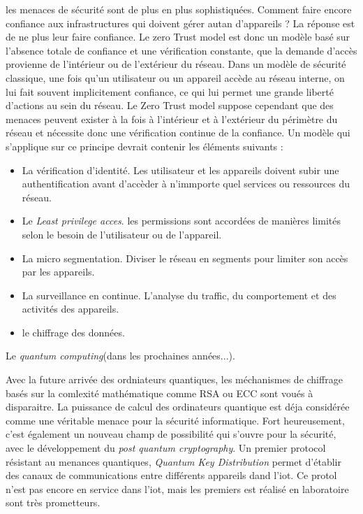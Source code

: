 les menaces de sécurité sont de plus en plus sophistiquées. Comment faire encore confiance aux infrastructures qui doivent gérer autan d'appareils ? La réponse est de ne plus leur faire confiance. Le zero Trust model est donc un modèle basé sur l'absence totale de confiance et une vérification constante, que la demande d'accès provienne de l'intérieur ou de l'extérieur du réseau. Dans un modèle de sécurité classique, une fois qu'un utilisateur ou un appareil accède au réseau interne, on lui fait souvent implicitement confiance, ce qui lui permet une grande liberté d'actions au sein du réseau. Le Zero Trust model suppose cependant que des menaces peuvent exister à la fois à l’intérieur et à l’extérieur du périmètre du réseau et nécessite donc une vérification continue de la confiance. Un modèle qui s'applique sur ce principe devrait contenir les éléments suivants\cite{zero1} :
\begin{itemize}
\item La vérification d'identité. Les utilisateur et les appareils doivent subir une authentification avant d'accèder à n'immporte quel services ou ressources du réseau.
\item Le \textit{Least privilege acces}. les permissions sont accordées de manières limités selon le besoin de l'utilisateur ou de l'appareil.
\item La micro segmentation. Diviser le réseau en segments pour limiter son accès par les appareils.
\item La surveillance en continue. L'analyse du traffic, du comportement et des activités des appareils.
\item le chiffrage des données.
\end{itemize}

\vspace{0.1cm}

Le \textit{quantum computing}(dans les prochaines années...).

Avec la future arrivée des ordniateurs quantiques, les méchanismes de chiffrage basés sur la comlexité mathématique comme RSA ou ECC sont voués à disparaitre\cite{quantumcrypto}. La puissance de calcul des ordinateurs quantique est déja considérée comme une véritable menace pour la sécurité informatique. Fort heureusement, c'est également un nouveau champ de possibilité qui s'ouvre pour la sécurité, avec le développement du \textit{post quantum cryptography}. Un premier protocol résistant au menances quantiques, \textit{Quantum Key Distribution} permet d'établir des canaux de communications entre différents appareils dand l'iot. Ce protol n'est pas encore en service dans l'iot, mais les premiers est réalisé en laboratoire sont très prometteurs\cite{qinternet}.